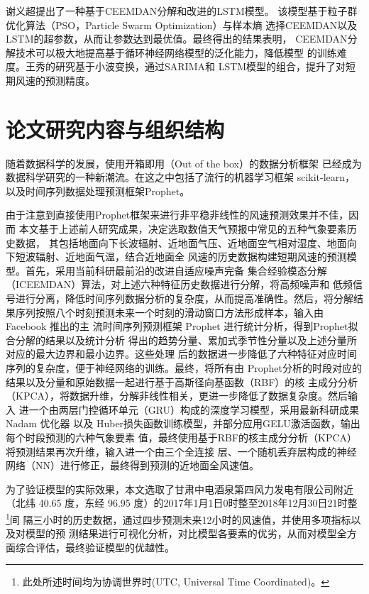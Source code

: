 \documentclass[AutoFakeBold]{LZUThesis}
\begin{document}
谢义超提出了一种基于CEEMDAN分解和改进的LSTM模型。
该模型基于粒子群优化算法（PSO，Particle Swarm Optimization）与样本熵
选择CEEMDAN以及LSTM的超参数，从而让参数达到最优值。最终得出的结果表明，
CEEMDAN分解技术可以极大地提高基于循环神经网络模型的泛化能力，降低模型
的训练难度。王秀的研究基于小波变换，通过SARIMA和
LSTM模型的组合，提升了对短期风速的预测精度。

\section{论文研究内容与组织结构}

随着数据科学的发展，使用开箱即用（Out of the box）的数据分析框架
已经成为数据科学研究的一种新潮流。在这之中包括了流行的机器学习框架
scikit-learn，以及时间序列数据处理预测框架Prophet。

由于注意到直接使用Prophet框架来进行非平稳非线性的风速预测效果并不佳，因而
本文基于上述前人研究成果，决定选取数值天气预报中常见的五种气象要素历史数据，
其包括地面向下长波辐射、近地面气压、近地面空气相对湿度、地面向下短波辐射、近地面气温，结合近地面全
风速的历史数据构建短期风速的预测模型。首先，采用当前科研最前沿的改进自适应噪声完备
集合经验模态分解（ICEEMDAN）算法，对上述六种特征历史数据进行分解，将高频噪声和
低频信号进行分离，降低时间序列数据分析的复杂度，从而提高准确性。然后，将分解结
果序列按照八个时刻预测未来一个时刻的滑动窗口方法形成样本，输入由 Facebook 推出的主
流时间序列预测框架 Prophet 进行统计分析，得到Prophet拟合分解的结果以及统计分析
得出的趋势分量、累加式季节性分量以及上述分量所对应的最大边界和最小边界。这些处理
后的数据进一步降低了六种特征对应时间序列的复杂度，便于神经网络的训练。最终，将所有由
Prophet分析的时段对应的结果以及分量和原始数据一起进行基于高斯径向基函数（RBF）的核
主成分分析（KPCA），将数据升维，分解非线性相关，更进一步降低了数据复杂度。然后输入
进一个由两层门控循环单元（GRU）构成的深度学习模型，采用最新科研成果 Nadam 优化器
以及 Huber损失函数训练模型，并部分应用GELU激活函数，输出每个时段预测的六种气象要素
值，最终使用基于RBF的核主成分分析（KPCA）将预测结果再次升维，输入进一个由三个全连接
层、一个随机丢弃层构成的神经网络（NN）进行修正，最终得到预测的近地面全风速值。

为了验证模型的实际效果，本文选取了甘肃中电酒泉第四风力发电有限公司附近（北纬
40.65 度，东经 96.95 度）的2017年1月1日0时整至2018年12月30日21时整
\footnote{此处所述时间均为协调世界时(UTC, Universal Time Coordinated)。}间
隔三小时的历史数据，通过四步预测未来12小时的风速值，并使用多项指标以及对模型的预
测结果进行可视化分析，对比模型各要素的优劣，从而对模型全方面综合评估，最终验证模型的优越性。
\end{document}

